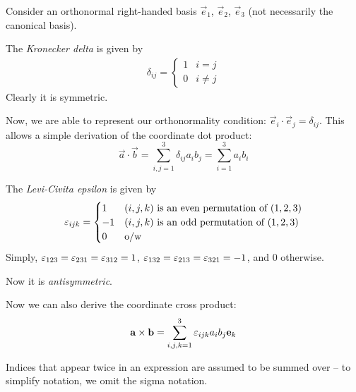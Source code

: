 \documentclass{../template/note}
\begin{document}
    Consider an orthonormal right-handed basis \(\vec e_1\), \(\vec e_2\), \(\vec e_3\) (not necessarily the canonical basis).

    \begin{definition}
        The \emph{Kronecker delta} is given by
        \begin{align*}
            \delta_{ij} = 
            \begin{cases}
                1 & i = j \\
                0 & i \neq j
            \end{cases}
        \end{align*}
        Clearly it is symmetric.
    \end{definition}
    Now, we are able to represent our orthonormality condition: \(\vec e_i \cdot \vec e_j = \delta_{ij}\). This allows a simple derivation of the coordinate dot product:
    \[
        \vec a \cdot \vec b = \sum_{i,j=1}^3 \delta_{ij}a_ib_j = \sum_{i=1}^3 a_ib_i
    \]
    \begin{definition}
        The \emph{Levi-Civita epsilon} is given by
        \begin{align*}
            \varepsilon_{ijk} =
            \begin{cases}
                1 & (i, j, k) \text{ is an even permutation of } (1, 2, 3) \\
                -1 & (i, j, k) \text{ is an odd permutation of } (1, 2, 3) \\
                0 & \text{o/w}
            \end{cases}
        \end{align*}
        Simply, \(\varepsilon_{123} = \varepsilon_{231} = \varepsilon_{312} = 1\), \(\varepsilon_{132} = \varepsilon_{213} = \varepsilon_{321} = -1\), and 0 otherwise.

        Now it is \emph{antisymmetric}.
    \end{definition}
    Now we can also derive the coordinate cross product:
    \[
        \vec a \times \vec b = \sum_{i,j,k=1}^3 \lv{ijk} a_i b_j \vec e_k
    \]

    \begin{definition}
        Indices that appear twice in an expression are assumed to be summed over -- to simplify notation, we omit the sigma notation.
    \end{definition}
    
\end{document}
